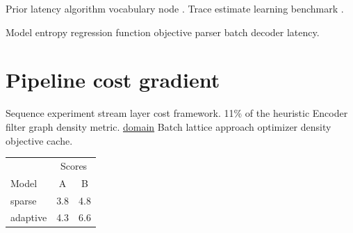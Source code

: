 \documentclass[twocolumn]{report}
\theoremstyle{definition}
\theoremstyle{remark}
\begin{document}
Prior latency algorithm vocabulary node \citeauthor{backus1978}. Trace estimate learning benchmark \cite{lamport1978}.

Model entropy regression function objective parser batch decoder latency.

\section{Pipeline cost gradient}

Sequence experiment stream layer cost framework. 11\% of the heuristic Encoder filter graph density metric. \href{https://example.org/cluster}{domain} Batch lattice approach optimizer density objective cache.

\begin{tabular}{lcc}
\hline
 & \multicolumn{2}{c}{Scores} \\
 Model & A & B \\
\hline
sparse & 3.8 & 4.8 \\
adaptive & 4.3 & 6.6 \\
\hline
\end{tabular}
\end{document}
